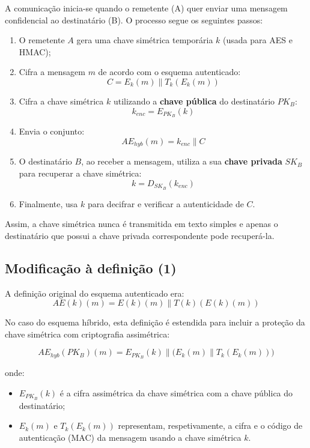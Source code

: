 A comunicação inicia-se quando o remetente (A) quer enviar uma mensagem confidencial ao destinatário (B). O processo segue os seguintes passos:

\begin{enumerate}
    \item O remetente \(A\) gera uma chave simétrica temporária \(k\) (usada para AES e HMAC);
    \item Cifra a mensagem \(m\) de acordo com o esquema autenticado:
    \[
    C = E_{k}(m) \parallel T_{k}(E_{k}(m))
    \]
    \item Cifra a chave simétrica \(k\) utilizando a \textbf{chave pública} do destinatário \(PK_B\):
    \[
    k_{enc} = E_{PK_B}(k)
    \]
    \item Envia o conjunto:
    \[
    AE_{hyb}(m) = k_{enc} \parallel C
    \]
    \item O destinatário \(B\), ao receber a mensagem, utiliza a sua \textbf{chave privada} \(SK_B\) para recuperar a chave simétrica:
    \[
    k = D_{SK_B}(k_{enc})
    \]
    \item Finalmente, usa \(k\) para decifrar e verificar a autenticidade de \(C\).
\end{enumerate}

Assim, a chave simétrica nunca é transmitida em texto simples e apenas o destinatário que possui a chave privada correspondente pode recuperá-la.

\subsection{Modificação à definição (1)}

A definição original do esquema autenticado era:
\[
AE(k)(m) = E(k)(m) \parallel T(k)(E(k)(m))
\]

No caso do esquema híbrido, esta definição é estendida para incluir a proteção da chave simétrica com criptografia assimétrica:

\[
AE_{hyb}(PK_B)(m) = E_{PK_B}(k) \parallel \big(E_{k}(m) \parallel T_{k}(E_{k}(m))\big)
\]

onde:
\begin{itemize}
    \item \(E_{PK_B}(k)\) é a cifra assimétrica da chave simétrica com a chave pública do destinatário;
    \item \(E_{k}(m)\) e \(T_{k}(E_{k}(m))\) representam, respetivamente, a cifra e o código de autenticação (MAC) da mensagem usando a chave simétrica \(k\).
\end{itemize}

